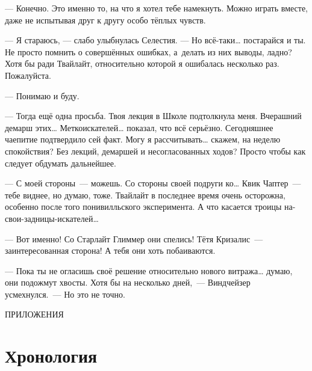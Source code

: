 \documentclass[fontsize=11pt,a5paper,titlepage=firstcover]{scrbook}
\begin{document}
--- Конечно. Это именно то, на что я хотел тебе намекнуть. Можно играть вместе, даже не испытывая друг к другу особо тёплых чувств.

--- Я стараюсь, --- слабо улыбнулась Селестия. --- Но всё-таки{\ldots} постарайся и ты. Не просто помнить о совершённых ошибках, а~делать из них выводы, ладно? Хотя бы ради Твайлайт, относительно которой я ошибалась несколько раз. Пожалуйста.

--- Понимаю и буду.

--- Тогда ещё одна просьба. Твоя лекция в Школе подтолкнула меня. Вчерашний демарш этих{\ldots} Меткоискателей{\ldots} показал, что всё серьёзно. Сегодняшнее чаепитие подтвердило сей факт. Могу я рассчитывать{\ldots} скажем, на неделю спокойствия? Без лекций, демаршей и несогласованных ходов? Просто чтобы как следует обдумать дальнейшее.

--- С моей стороны~--- можешь. Со стороны своей подруги ко{\ldots} Квик Чаптер~--- тебе виднее, но думаю, тоже. Твайлайт в последнее время очень осторожна, особенно после того понивилльского эксперимента. А что касается троицы на-свои-задницы-искателей{\ldots}

--- Вот именно! Со Старлайт Глиммер они спелись! Тётя Кризалис~--- заинтересованная сторона! А тебя они хоть побаиваются.

--- Пока ты не огласишь своё решение относительно нового витража{\ldots} думаю, они подожмут хвосты. Хотя бы на несколько дней,~--- Виндчейзер усмехнулся.~--- Но это не точно.


\backmatter

\appendix

\cleardoublepage
\thispagestyle{empty}

\mbox{}

\vspace{.3\textheight}
\begin{center}
	\Huge{ПРИЛОЖЕНИЯ}
\end{center}


\chapter*{Хронология}


\newlength{\ado}
\ado=2.15mm
\end{document}
